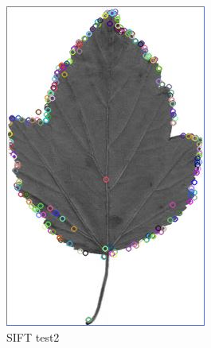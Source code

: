 \documentclass[xcolor=table]{beamer}
\begin{document}
\begin{frame}
\begin{figure}[htbp]
\begin{minipage}[c]{.45\linewidth}
\begin{itemize}
    \end{itemize}
    \end{minipage}
    \hfill
    \begin{minipage}[c]{.45\linewidth}
      \begin{center}
	\includegraphics[scale=0.27]{siftKP.jpg}
	\caption{SIFT test2}
	\label{figure:Illustration}
      \end{center}
    \end{minipage}
  \end{figure}





\end{frame}
\end{document}
